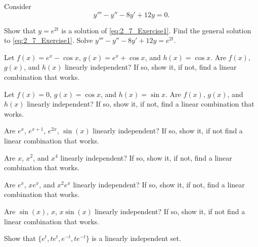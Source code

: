 \begin{exercise}
Consider 
\begin{equation}
y'''-y''-8y'+12y=0. \label{eq:2_7_Exercise1}
\end{equation}
\begin{tasks}
\task Show that $y=e^{2t}$ is a solution of \eqref{eq:2_7_Exercise1}.
\task Find the general solution to \eqref{eq:2_7_Exercise1}.
\task Solve $y'''-y''-8y'+12y=e^{2t}$.
\end{tasks}
\end{exercise}

\begin{exercise}
Let
$f(x) = e^x - \cos x$, $g(x) = e^x + \cos x$, and $h(x) = \cos x$.
Are $f(x)$, $g(x)$, and $h(x)$
linearly independent?  If so, show
it, if not, find a linear combination that works.
\end{exercise}

\begin{exercise}
Let
$f(x) = 0$, $g(x) = \cos x$, and $h(x) = \sin x$.
Are $f(x)$, $g(x)$, and $h(x)$
linearly independent?  If so, show
it, if not, find a linear combination that works.
\end{exercise}

\begin{exercise}\ansMark%
Are $e^{x}$, $e^{x+1}$, $e^{2x}$, $\sin(x)$ linearly independent?
If so, show it, if not find a linear combination that works.
\end{exercise}

\begin{exercise}
Are $x$, $x^2$, and $x^4$
linearly independent?  If so, show
it, if not, find a linear combination that works.
\end{exercise}

\begin{exercise}
Are $e^x$, $xe^x$, and $x^2e^x$
linearly independent?  If so, show
it, if not, find a linear combination that works.
\end{exercise}

\begin{exercise}\ansMark%
Are $\sin(x)$, $x$, $x\sin(x)$ linearly independent?
If so, show it, if not find a linear combination that works.
\end{exercise}

\begin{exercise}
Show that $\{e^t, te^t, e^{-t}, te^{-t}\}$ is a linearly independent set.
\end{exercise}

